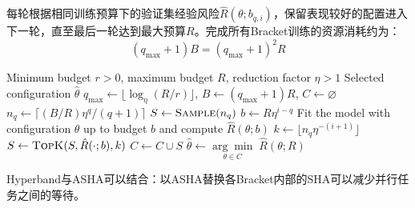 每轮根据相同训练预算下的验证集经验风险$\hat{R}(\theta;b_{q,i})$，保留表现较好的配置进入下一轮，直至最后一轮达到最大预算$R$。完成所有Bracket训练的资源消耗约为：
\begin{equation*}
	(q_{\max}+1)B=(q_{\max}+1)^2R
\end{equation*}
\begin{algorithm}[H]
	\caption{Hyperband}
	\label{alg:hyperband}
	\begin{algorithmic}[1]
		\Require Minimum budget $r>0$, maximum budget $R$, reduction factor $\eta>1$
		\Ensure Selected configuration $\hat{\theta}$
		\State $q_{\max}\gets\lfloor\log_\eta(R/r)\rfloor$, $B\gets(q_{\max}+1)R$, $C\gets\varnothing$
		\State $n_q\gets\lceil(B/R)\eta^q/(q+1)\rceil$
		\State $S\gets\Call{Sample}{n_q}$ 
		\State $b\gets R\eta^{i-q}$
		\State Fit the model with configuration $\theta$ up to budget $b$ and compute $\hat{R}(\theta;b)$
		\EndFor
		\State $k\gets\lfloor n_q\eta^{-(i+1)}\rfloor$
		\State $S\gets\Call{TopK}{S,\hat{R}(\cdot;b),k}$
		\Else
		\State $C\gets C\cup S$ 
		\EndIf
		\EndFor
		\EndFor
		\State \Return $\hat{\theta}\gets\underset{\theta\in C}{\arg\min}\;\hat{R}(\theta;R)$
	\end{algorithmic}
\end{algorithm}
Hyperband与ASHA可以结合：以ASHA替换各Bracket内部的SHA可以减少并行任务之间的等待。
